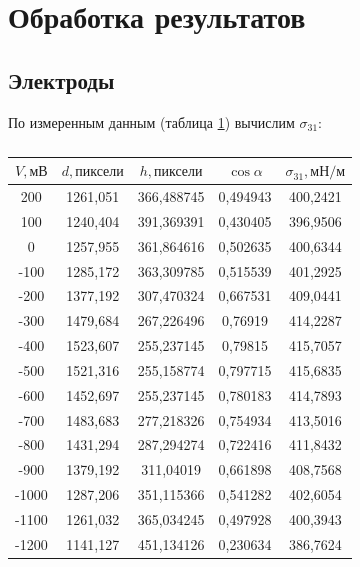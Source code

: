 \documentclass[a4paper, 12pt]{article}
\begin{document}
\subsection*{}
\newpage
\section{Обработка результатов}
\subsection{Электроды}

По измеренным данным (таблица \ref{sigma31}) вычислим $\sigma_{31}$:\\

\begin{table}[h]
\centering
\caption{}
\label{sigma31}
\begin{tabular}{|c|c|c|c|c|}
\hline
$V, \text{мВ}$  & $d, \text{пиксели}$ & $h, \text{пиксели}$ & $\cos{\alpha}$     & $\sigma_{31},\text{мН/м}$\\ \hline
200   & 1261,051  & 366,488745 & 0,494943 & 400,2421  \\ \hline
100   & 1240,404  & 391,369391 & 0,430405 & 396,9506  \\ \hline
0     & 1257,955  & 361,864616 & 0,502635 & 400,6344  \\ \hline
-100  & 1285,172  & 363,309785 & 0,515539 & 401,2925  \\ \hline
-200  & 1377,192  & 307,470324 & 0,667531 & 409,0441  \\ \hline
-300  & 1479,684  & 267,226496 & 0,76919  & 414,2287  \\ \hline
-400  & 1523,607  & 255,237145 & 0,79815  & 415,7057  \\ \hline
-500  & 1521,316  & 255,158774 & 0,797715 & 415,6835  \\ \hline
-600  & 1452,697  & 255,237145 & 0,780183 & 414,7893  \\ \hline
-700  & 1483,683  & 277,218326 & 0,754934 & 413,5016  \\ \hline
-800  & 1431,294  & 287,294274 & 0,722416 & 411,8432  \\ \hline
-900  & 1379,192  & 311,04019  & 0,661898 & 408,7568  \\ \hline
-1000 & 1287,206  & 351,115366 & 0,541282 & 402,6054  \\ \hline
-1100 & 1261,032  & 365,034245 & 0,497928 & 400,3943  \\ \hline
-1200 & 1141,127  & 451,134126 & 0,230634 & 386,7624  \\ \hline
\end{tabular}
\end{table}
\end{document}
